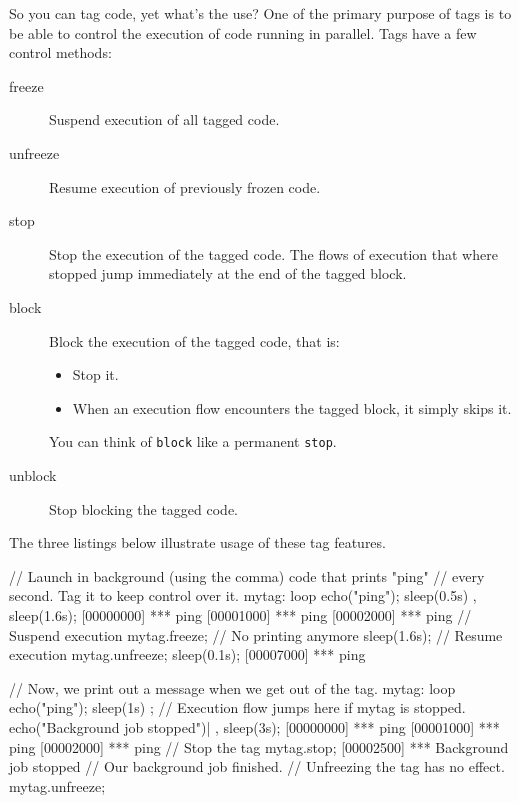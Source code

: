 So you can tag code, yet what's the use? One of the primary purpose of
tags is to be able to control the execution of code running in
parallel. Tags have a few control methods:

\begin{description}
\item[freeze] Suspend execution of all tagged code.
\item[unfreeze] Resume execution of previously frozen code.
\item[stop] Stop the execution of the tagged code. The flows of
  execution that where stopped jump immediately at the end of the
  tagged block.
\item[block] Block the execution of the tagged code, that is:
  \begin{itemize}
  \item Stop it.
  \item When an execution flow encounters the tagged block, it simply
    skips it.
  \end{itemize}
  You can think of \lstinline{block} like a permanent \lstinline{stop}.
\item[unblock] Stop blocking the tagged code.
\end{description}

The three listings below illustrate usage of these tag features.

\begin{urbiscript}
// Launch in background (using the comma) code that prints "ping"
// every second.  Tag it to keep control over it.
mytag:
{
  loop
  {
    echo("ping");
    sleep(0.5s)
  }
},
sleep(1.6s);
[00000000] *** ping
[00001000] *** ping
[00002000] *** ping
// Suspend execution
mytag.freeze;
// No printing anymore
sleep(1.6s);
// Resume execution
mytag.unfreeze;
sleep(0.1s);
[00007000] *** ping
\end{urbiscript}

\begin{urbiscript}
// Now, we print out a message when we get out of the tag.
{
  mytag:
  {
    loop
    {
      echo("ping"); sleep(1s)
    }
  };
  // Execution flow jumps here if mytag is stopped.
  echo("Background job stopped")|
},
sleep(3s);
[00000000] *** ping
[00001000] *** ping
[00002000] *** ping
// Stop the tag
mytag.stop;
[00002500] *** Background job stopped
// Our background job finished.
// Unfreezing the tag has no effect.
mytag.unfreeze;
\end{urbiscript}

